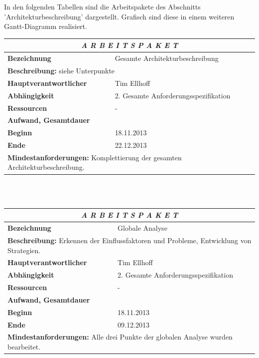 \documentclass[fontsize=12pt,paper=a4,twoside]{scrartcl}
\begin{document}
In den folgenden Tabellen sind die Arbeitspakete des Abschnitts 'Architekturbeschreibung' dargestellt. Grafisch sind diese in einem weiteren Gantt-Diagramm realisiert.

\begin{tabular}{p{7.5cm}|p{7.5cm}}\toprule
\multicolumn{2}{c}{\textbf{\textit{A R B E I T S P A K E T \quad 3}}} \\ \toprule \hline
\textbf{Bezeichnung} & Gesamte Architekturbeschreibung\\\hline
\multicolumn{2}{p{15cm}}{\textbf{Beschreibung:} \newline 
siehe Unterpunkte}  \\\hline
\textbf{Hauptverantwortlicher} & Tim Ellhoff \\\hline
\textbf{Abhängigkeit} & 2. Gesamte Anforderungsspezifikation\\\hline
\textbf{Ressourcen} & -
\\\hline
\textbf{Aufwand, Gesamtdauer} & \\\hline
\textbf{Beginn} & 18.11.2013 \\\hline
\textbf{Ende} & 22.12.2013\\\hline
\multicolumn{2}{p{15cm}}{\textbf{Mindestanforderungen: } \newline
Komplettierung der gesamten Architekturbeschreibung. }  \\ \toprule
\end{tabular} \\\\

\begin{tabular}{p{7.5cm}|p{7.5cm}}\toprule
\multicolumn{2}{c}{\textbf{\textit{A R B E I T S P A K E T \quad 3.1}}} \\ \toprule \hline
\textbf{Bezeichnung} & Globale Analyse\\\hline
\multicolumn{2}{p{15cm}}{\textbf{Beschreibung:} \newline 
Erkennen der Einflussfaktoren und Probleme, Entwicklung von Strategien.}  \\\hline
\textbf{Hauptverantwortlicher} & Tim Ellhoff \\\hline
\textbf{Abhängigkeit} & 2. Gesamte Anforderungsspezifikation\\\hline
\textbf{Ressourcen} & -
\\\hline
\textbf{Aufwand, Gesamtdauer} & \\\hline
\textbf{Beginn} & 18.11.2013 \\\hline
\textbf{Ende} & 09.12.2013\\\hline
\multicolumn{2}{p{15cm}}{\textbf{Mindestanforderungen: } \newline
Alle drei Punkte der globalen Analyse wurden bearbeitet. }  \\ \toprule
\end{tabular} \\\\
\end{document}
